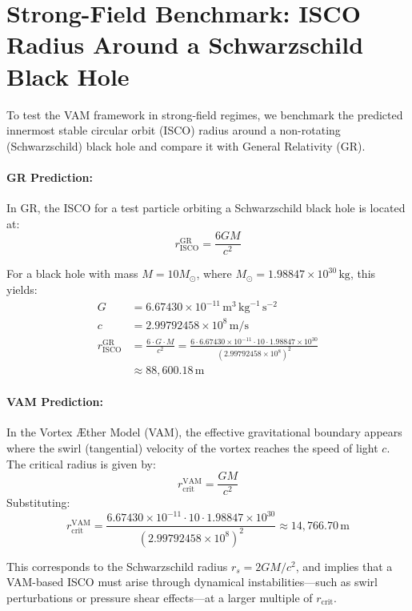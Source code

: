 \section{Strong-Field Benchmark: ISCO Radius Around a Schwarzschild Black Hole}

To test the VAM framework in strong-field regimes, we benchmark the predicted innermost stable circular orbit (ISCO) radius around a non-rotating (Schwarzschild) black hole and compare it with General Relativity (GR).

\paragraph{GR Prediction:}
In GR, the ISCO for a test particle orbiting a Schwarzschild black hole is located at:
\begin{equation}
    r_{\text{ISCO}}^{\text{GR}} = \frac{6GM}{c^2}
\end{equation}

For a black hole with mass \( M = 10 M_\odot \), where \( M_\odot = 1.98847 \times 10^{30} \, \text{kg} \), this yields:
\begin{align*}
    G &= 6.67430 \times 10^{-11} \, \text{m}^3 \, \text{kg}^{-1} \, \text{s}^{-2} \\
    c &= 2.99792458 \times 10^8 \, \text{m/s} \\
    r_{\text{ISCO}}^{\text{GR}} &= \frac{6 \cdot G \cdot M}{c^2}
    = \frac{6 \cdot 6.67430 \times 10^{-11} \cdot 10 \cdot 1.98847 \times 10^{30}}{(2.99792458 \times 10^8)^2} \\
    &\approx 88{,}600.18 \, \text{m}
\end{align*}

\paragraph{VAM Prediction:}
In the Vortex Æther Model (VAM), the effective gravitational boundary appears where the swirl (tangential) velocity of the vortex reaches the speed of light \( c \). The critical radius is given by:
\begin{equation}
    r_{\text{crit}}^{\text{VAM}} = \frac{GM}{c^2}
\end{equation}
Substituting:
\[
    r_{\text{crit}}^{\text{VAM}} = \frac{6.67430 \times 10^{-11} \cdot 10 \cdot 1.98847 \times 10^{30}}{(2.99792458 \times 10^8)^2}
    \approx 14{,}766.70 \, \text{m}
\]

This corresponds to the Schwarzschild radius \( r_s = 2GM/c^2 \), and implies that a VAM-based ISCO must arise through dynamical instabilities—such as swirl perturbations or pressure shear effects—at a larger multiple of \( r_{\text{crit}} \).

